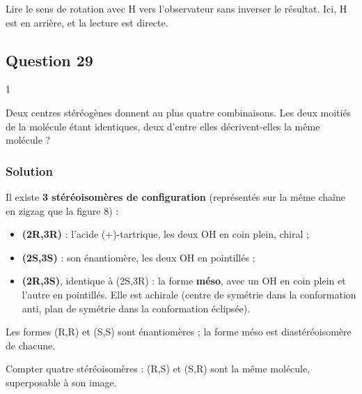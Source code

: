 \documentclass[11pt,a4paper]{article}
\providecommand{\tightlist}{\setlength{\itemsep}{0pt}\setlength{\parskip}{0pt}}
\begin{document}
\begin{piege}

Lire le sens de rotation avec H vers l'observateur sans inverser le résultat. Ici, H est en arrière, et la lecture est directe.

\end{piege}

\hypertarget{question-29}{%
\subsection{Question 29}\label{question-29}}

\begin{indication}{1}

Deux centres stéréogènes donnent au plus quatre combinaisons. Les deux moitiés de la molécule étant identiques, deux d'entre elles décrivent-elles la même molécule ?

\end{indication}

\hypertarget{solution-28}{%
\subsubsection{Solution}\label{solution-28}}

Il existe \textbf{3 stéréoisomères de configuration} (représentés sur la même chaîne en zigzag que la figure 8) :

\begin{itemize}
\tightlist
\item
  \textbf{(2R,3R)} : l'acide (+)-tartrique, les deux OH en coin plein, chiral ;
\item
  \textbf{(2S,3S)} : son énantiomère, les deux OH en pointillés ;
\item
  \textbf{(2R,3S)}, identique à (2S,3R) : la forme \textbf{méso}, avec un OH en coin plein et l'autre en pointillés. Elle est achirale (centre de symétrie dans la conformation anti, plan de symétrie dans la conformation éclipsée).
\end{itemize}

Les formes (R,R) et (S,S) sont énantiomères ; la forme méso est diastéréoisomère de chacune.

\begin{piege}

Compter quatre stéréoisomères : (R,S) et (S,R) sont la même molécule, superposable à son image.

\end{piege}
\end{document}

